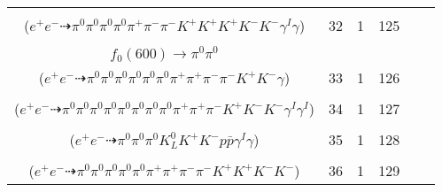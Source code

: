 \documentclass[landscape]{article}
\newcounter{rownumbers}
\newcommand\rn{\stepcounter{rownumbers}\arabic{rownumbers}}
\newcommand{\EOLP}{\\ \hline} %
\newcommand{\topoTags}[1]{#1} %
\begin{document}
\begin{longtable}{clcccc}
\rn & \makecell[l]{ $ 
e^{+} e^{-} \rightarrow \pi^{0} \pi^{-} K^{+} K^{-} D^{*+} \bar{D}^{*0} \gamma^{I} ,
D^{*+} \rightarrow \pi^{0} D^{+} ,
\bar{D}^{*0} \rightarrow \bar{D}^{0} \gamma ,
D^{+} \rightarrow \pi^{+} K^{-} K^{*+} ,
\bar{D}^{0} \rightarrow \pi^{0} \pi^{-} K^{+} ,
K^{*+} \rightarrow \pi^{0} K^{+} 
$ \\ ($
e^{+} e^{-} \dashrightarrow \pi^{0} \pi^{0} \pi^{0} \pi^{0} \pi^{+} \pi^{-} \pi^{-} K^{+} K^{+} K^{+} K^{-} K^{-} \gamma^{I} \gamma 
$) } & \topoTags{32 & }1 & 125 \EOLP

\rn & \makecell[l]{ $ 
e^{+} e^{-} \rightarrow \pi^{0} \pi^{0} \pi^{+} \rho^{-} \bar{D}^{0} D^{*0} ,
\rho^{-} \rightarrow \pi^{0} \pi^{-} ,
\bar{D}^{0} \rightarrow K^{+} a_{1}^{-} ,
D^{*0} \rightarrow D^{0} \gamma ,
a_{1}^{-} \rightarrow \pi^{-} f_{0}(600) ,
D^{0} \rightarrow \pi^{0} \pi^{+} K^{-} ,
$ \\ $
f_{0}(600) \rightarrow \pi^{0} \pi^{0} 
$ \\ ($
e^{+} e^{-} \dashrightarrow \pi^{0} \pi^{0} \pi^{0} \pi^{0} \pi^{0} \pi^{0} \pi^{+} \pi^{+} \pi^{-} \pi^{-} K^{+} K^{-} \gamma 
$) } & \topoTags{33 & }1 & 126 \EOLP

\rn & \makecell[l]{ $ 
e^{+} e^{-} \rightarrow \pi^{0} \pi^{-} \eta D^{*+} \bar{D}^{*0} \gamma^{I} \gamma^{I} ,
\eta \rightarrow \pi^{0} \pi^{0} \pi^{0} ,
D^{*+} \rightarrow \pi^{+} D^{0} ,
\bar{D}^{*0} \rightarrow \pi^{0} \bar{D}^{0} ,
D^{0} \rightarrow \pi^{0} \pi^{+} K^{-} ,
\bar{D}^{0} \rightarrow \pi^{0} \pi^{0} K^{+} K^{-} 
$ \\ ($
e^{+} e^{-} \dashrightarrow \pi^{0} \pi^{0} \pi^{0} \pi^{0} \pi^{0} \pi^{0} \pi^{0} \pi^{0} \pi^{+} \pi^{+} \pi^{-} K^{+} K^{-} K^{-} \gamma^{I} \gamma^{I} 
$) } & \topoTags{34 & }1 & 127 \EOLP

\rn & \makecell[l]{ $ 
e^{+} e^{-} \rightarrow D^{*0} \bar{D}^{*0} p \bar{p} \gamma^{I} ,
D^{*0} \rightarrow D^{0} \gamma ,
\bar{D}^{*0} \rightarrow \pi^{0} \bar{D}^{0} ,
D^{0} \rightarrow K_{L}^{0} K^{+} K^{-} ,
\bar{D}^{0} \rightarrow \pi^{0} \pi^{0} 
$ \\ ($
e^{+} e^{-} \dashrightarrow \pi^{0} \pi^{0} \pi^{0} K_{L}^{0} K^{+} K^{-} p \bar{p} \gamma^{I} \gamma 
$) } & \topoTags{35 & }1 & 128 \EOLP

\rn & \makecell[l]{ $ 
e^{+} e^{-} \rightarrow \pi^{0} K^{+} K^{-} D^{*0} \bar{D}^{*0} ,
D^{*0} \rightarrow \pi^{0} D^{0} ,
\bar{D}^{*0} \rightarrow \pi^{0} \bar{D}^{0} ,
D^{0} \rightarrow \pi^{+} \omega K^{-} ,
\bar{D}^{0} \rightarrow \pi^{0} \pi^{-} K^{+} ,
\omega \rightarrow \pi^{0} \pi^{+} \pi^{-} 
$ \\ ($
e^{+} e^{-} \dashrightarrow \pi^{0} \pi^{0} \pi^{0} \pi^{0} \pi^{0} \pi^{+} \pi^{+} \pi^{-} \pi^{-} K^{+} K^{+} K^{-} K^{-} 
$) } & \topoTags{36 & }1 & 129 \EOLP


\end{longtable}
\end{document}
